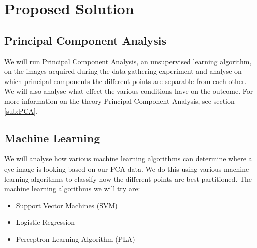 \section{Proposed Solution}
\subsection{Principal Component Analysis}
We will run Principal Component Analysis, an unsupervised learning algorithm, on the images acquired during the data-gathering experiment and analyse on which principal components the different points are separable from each other.
We will also analyse what effect the various conditions have on the outcome. %
For more information on the theory Principal Component Analysis, see section \ref{sub:PCA}.

\subsection{Machine Learning}
We will analyse how various machine learning algorithms can determine where a eye-image is looking based on our PCA-data.
We do this using various machine learning algorithms to classify how the different points are best partitioned.
The machine learning algorithms we will try are:
\begin{itemize}
	\item{Support Vector Machines (SVM)}
	\item{Logistic Regression}
	\item{Perceptron Learning Algorithm (PLA)}
\end{itemize}





